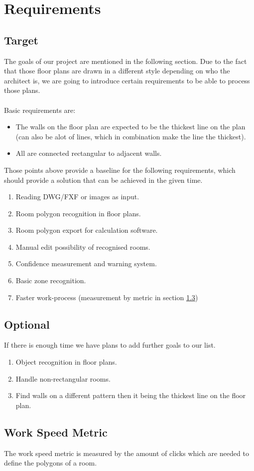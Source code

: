 \chapter{Requirements}
\section{Target}
The goals of our project are mentioned in the following section. Due to the fact that those floor plans are drawn in a different style depending on who the architect is, we are going to introduce certain requirements to be able to process those plans.
\\\\
Basic requirements are:
\begin{itemize}
	\item The walls on the floor plan are expected to be the thickest line on the plan (can also be alot of lines, which in combination make the line the thickest).
	\item All are connected rectangular to adjacent walls.	
\end{itemize}

\noindent Those points above provide a baseline for the following requirements, which should provide a solution that can be achieved in the given time.

\begin{enumerate}
\item Reading DWG/FXF or images as input.
\item Room polygon recognition in floor plans.
\item Room polygon export for calculation software.
\item Manual edit possibility of recognised rooms.
\item Confidence measurement and warning system.
\item Basic zone recognition.
\item Faster work-process (measurement by metric in section \ref{sec:metric})
\end{enumerate}

\section{Optional}
If there is enough time we have plans to add further goals to our list.
\begin{enumerate}
\item Object recognition in floor plans.
\item Handle non-rectangular rooms.
\item Find walls on a different pattern then it being the thickest line on the floor plan.
\end{enumerate}

\section{Work Speed Metric}
\label{sec:metric}
The work speed metric is measured by the amount of clicks which are needed to define the polygons of a room.